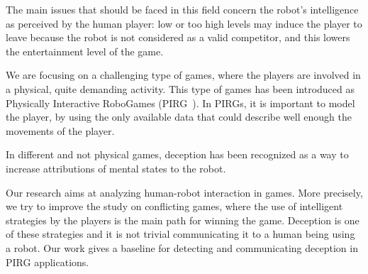 
The main issues that should be faced in this field concern the robot's intelligence as perceived by the human player: low or too high levels may induce the player to leave because the robot is not considered as a valid competitor, and this lowers the entertainment level of the game. 

We are focusing on a challenging type of games, where the players are involved in a physical, quite demanding activity. This type of games has been introduced as Physically Interactive RoboGames (PIRG~\cite{martinoia_physically_2013}). In PIRGs, it is important to model the player, by using the only available data that could describe well enough the movements of the player.

In different and not physical games, deception has been recognized as a way to increase attributions of mental states to the robot\cite{shim2013taxonomy}.

Our research aims at analyzing human-robot interaction in games. More  precisely, we try to improve the study on conflicting games, where the use of intelligent strategies by the players is the main path for winning the game. Deception is one of these strategies and it is not trivial communicating it to a human being using a robot. Our work gives a baseline for detecting and communicating deception in PIRG applications.

